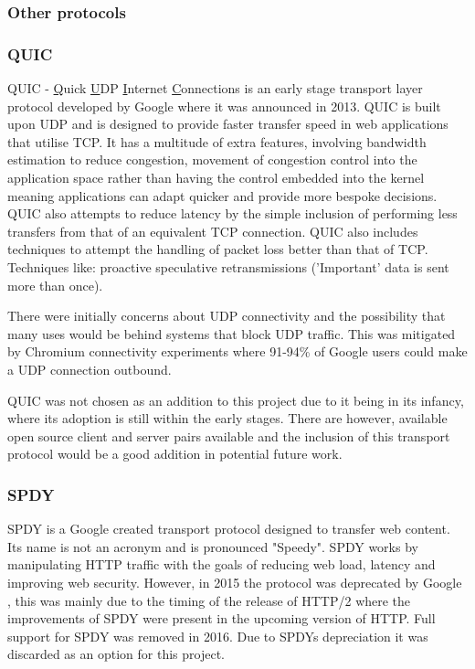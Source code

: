 \subsubsection{Other protocols}
\subsubsection*{QUIC}
QUIC - \underline{Q}uick \underline{U}DP \underline{I}nternet \underline{C}onnections \citep{hamilton2016quic} is an early stage transport layer protocol developed by Google where it was announced in 2013. QUIC is built upon UDP and is designed to provide faster transfer speed in web applications that utilise TCP.
It has a multitude of extra features, involving bandwidth estimation to reduce congestion, movement of congestion control into the application space rather than having the control embedded into the kernel meaning applications can adapt quicker and provide more bespoke decisions. QUIC also attempts to reduce latency by the simple inclusion of performing less transfers from that of an equivalent TCP connection. QUIC also includes techniques to attempt the handling of packet loss better than that of TCP. Techniques like: proactive speculative retransmissions ('Important' data is sent more than once).

There were initially concerns about UDP connectivity and the possibility that many uses would be behind systems that block UDP traffic. This was mitigated by Chromium connectivity experiments \citep{roskind2013quic} where 91-94\% of Google users could make a UDP connection outbound.

QUIC was not chosen as an addition to this project due to it being in its infancy, where its adoption is still within the early stages. There are however, available open source client and server pairs available and the inclusion of this transport protocol would be a good addition in potential future work.

\subsubsection*{SPDY}
SPDY \citep{belshe2012spdy} is a Google created transport protocol designed to transfer web content. Its name is not an acronym and is pronounced "Speedy". SPDY works by manipulating HTTP traffic with the goals of reducing web load, latency and improving web security. However, in 2015 the protocol was deprecated by Google \citep{blog2015hello}, this was mainly due to the timing of the release of HTTP/2 where the improvements of SPDY were present in the upcoming version of HTTP. Full support for SPDY was removed in 2016. Due to SPDYs depreciation it was discarded as an option for this project.

